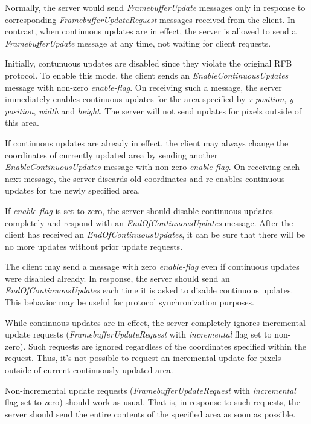 \documentclass[a4paper]{article}
\newcommand{\typestr}[1]{\textit{#1}}
\begin{document}
Normally, the server would send \typestr{FramebufferUpdate} messages
only in response to corresponding \typestr{FramebufferUpdateRequest}
messages received from the client. In contrast, when continuous
updates are in effect, the server is allowed to send a
\typestr{FramebufferUpdate} message at any time, not waiting for
client requests.

Initially, contunuous updates are disabled since they violate the
original RFB protocol. To enable this mode, the client sends an
\typestr{EnableContinuousUpdates} message with non-zero
\typestr{enable-flag}. On receiving such a message, the server
immediately enables continuous updates for the area specified by
\typestr{x-position}, \typestr{y-position}, \typestr{width} and
\typestr{height}. The server will not send updates for pixels outside
of this area.

If continuous updates are already in effect, the client may always
change the coordinates of currently updated area by sending another
\typestr{EnableContinuousUpdates} message with non-zero
\typestr{enable-flag}. On receiving each next message, the server
discards old coordinates and re-enables continuous updates for the
newly specified area.

If \typestr{enable-flag} is set to zero, the server should disable
continuous updates completely and respond with an
\typestr{EndOfContinuousUpdates} message. After the client has
received an \typestr{EndOfContinuousUpdates}, it can be sure that
there will be no more updates without prior update requests.

The client may send a message with zero \typestr{enable-flag} even if
continuous updates were disabled already. In response, the server
should send an \typestr{EndOfContinuousUpdates} each time it is asked
to disable continuous updates. This behavior may be useful for
protocol synchronization purposes.

While continuous updates are in effect, the server completely ignores
incremental update requests (\typestr{FramebufferUpdateRequest} with
\typestr{incremental} flag set to non-zero). Such requests are ignored
regardless of the coordinates specified within the request. Thus, it's
not possible to request an incremental update for pixels outside of
current continuously updated area.

Non-incremental update requests (\typestr{FramebufferUpdateRequest}
with \typestr{incremental} flag set to zero) should work as usual.
That is, in response to such requests, the server should send the
entire contents of the specified area as soon as possible.
\end{document}

